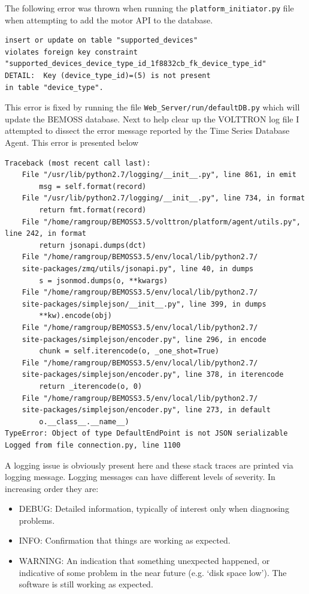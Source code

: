 \documentclass[fontsize=11pt, %
                             paper=letter, %
                             twoside, %
                             captions=tableheading,
                             index=totoc,
                             hyperref]{labbook}
\begin{document}
\begin{addmargin}[0cm]{0cm}
The following error was thrown when running the \texttt{platform\_initiator.py} file when attempting to add the motor API to the database.
\begin{verbatim}
insert or update on table "supported_devices" 
violates foreign key constraint
"supported_devices_device_type_id_1f8832cb_fk_device_type_id"
DETAIL:  Key (device_type_id)=(5) is not present 
in table "device_type".
\end{verbatim}
This error is fixed by running the file \texttt{Web\_Server/run/defaultDB.py} which will update the BEMOSS database. Next to help clear up the VOLTTRON log file I attempted to dissect the error message reported by the Time Series Database Agent. This error is presented below
\begin{Verbatim}[tabsize=4]
Traceback (most recent call last):
	File "/usr/lib/python2.7/logging/__init__.py", line 861, in emit
		msg = self.format(record)
	File "/usr/lib/python2.7/logging/__init__.py", line 734, in format
		return fmt.format(record)
	File "/home/ramgroup/BEMOSS3.5/volttron/platform/agent/utils.py", line 242, in format
		return jsonapi.dumps(dct)
	File "/home/ramgroup/BEMOSS3.5/env/local/lib/python2.7/
	site-packages/zmq/utils/jsonapi.py", line 40, in dumps
		s = jsonmod.dumps(o, **kwargs)
	File "/home/ramgroup/BEMOSS3.5/env/local/lib/python2.7/
	site-packages/simplejson/__init__.py", line 399, in dumps
		**kw).encode(obj)
	File "/home/ramgroup/BEMOSS3.5/env/local/lib/python2.7/
	site-packages/simplejson/encoder.py", line 296, in encode
		chunk = self.iterencode(o, _one_shot=True)
	File "/home/ramgroup/BEMOSS3.5/env/local/lib/python2.7/
	site-packages/simplejson/encoder.py", line 378, in iterencode
		return _iterencode(o, 0)
	File "/home/ramgroup/BEMOSS3.5/env/local/lib/python2.7/
	site-packages/simplejson/encoder.py", line 273, in default
		o.__class__.__name__)
TypeError: Object of type DefaultEndPoint is not JSON serializable
Logged from file connection.py, line 1100
\end{Verbatim}
A logging issue is obviously present here and these stack traces are printed via logging message. Logging messages can have different levels of severity. In increasing order they are:
\begin{itemize}
\item DEBUG: Detailed information, typically of interest only when diagnosing problems.
\item INFO: Confirmation that things are working as expected.
\item WARNING: An indication that something unexpected happened, or indicative of some problem in the near future (e.g. ‘disk space low’). The software is still working as expected.

\end{itemize}
\end{addmargin}
\end{document}
